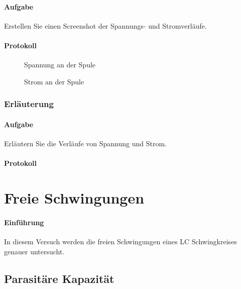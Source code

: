 \documentclass[10pt]{report}
\begin{document}
        \paragraph{Aufgabe}
        Erstellen Sie einen Screenshot der Spannungs- und Stromverläufe.

        \paragraph{Protokoll}
        \begin{center}
            \begin{figure}[H]
                \caption{Spannung an der Spule}
            \end{figure}
            \begin{figure}[H]
                \caption{Strom an der Spule}
            \end{figure}
        \end{center}

        \subsubsection{Erläuterung}
        \paragraph{Aufgabe}
        Erläutern Sie die Verläufe von Spannung und Strom.

        \paragraph{Protokoll}

        \section{Freie Schwingungen}
        \paragraph{Einführung}
        In diesem Versuch werden die freien Schwingungen eines LC Schwingkreises genauer untersucht.

        \subsection{Parasitäre Kapazität}
\end{document}
